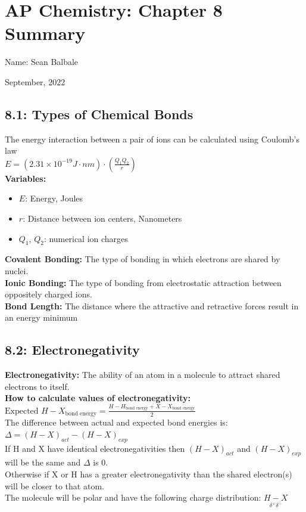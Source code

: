 \documentclass[12pt]{extarticle}
\author{Sean Balbale}
\date{September 2022}
\begin{document}
\section*{AP Chemistry: Chapter 8 Summary}
\begin{enumerate*}[label={}]
    \item Name: Sean Balbale
    \item September, 2022
\end{enumerate*}
\subsection*{8.1: Types of Chemical Bonds}
The energy interaction between a pair of ions can be calculated using Coulomb's law
\\$E=(2.31 \times 10^{-19} J \cdot nm)\cdot(\frac{Q_1Q_2}{r})$
\\\textbf{Variables:}
\begin{itemize}[label={}]
    \item $E$: Energy, Joules
    \item $r$: Distance between ion centers, Nanometers
    \item $Q_1$, $Q_2$: numerical ion charges
\end{itemize}
\textbf{Covalent Bonding:}
The type of bonding in which electrons are shared by nuclei.
\\\textbf{Ionic Bonding:}
The type of bonding from electrostatic attraction between oppositely charged ions.
\\\textbf{Bond Length:}
The distance where the attractive and retractive forces result in an energy minimum

\subsection*{8.2: Electronegativity}
\textbf{Electronegativity:}
The ability of an atom in a molecule to attract shared electrons to itself.
\\\textbf{How to calculate values of electronegativity:}
$\text{Expected }H - X_{\text{bond energy}} = \frac{H-H_{\text{bond energy}} + X- X_{\text{bond energy}}}{2}$
\\The difference between actual and expected bond energies is:
$\Delta = (H-X)_{act} - (H-X)_{exp}$
\\ If H and X have identical electronegativities then $(H-X)_{act}$ and $(H-X)_{exp}$ will be the same and $\Delta$ is 0.
\\ Otherwise if X or H has a greater electronegativity than the shared electron(s) will be closer to that atom.
\\ The molecule will be polar and have the following charge distribution: $\underset{\delta^+\delta^-}{H-X}$
\end{document}
